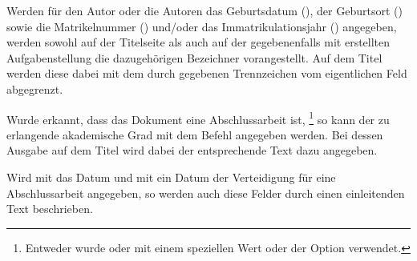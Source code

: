 \begin{Declaration}{}
\begin{Declaration}{}
\begin{Declaration}{}
\begin{Declaration}{}
\printdeclarationlist%
%
%
Werden für den Autor oder die Autoren das Geburtsdatum (), 
der Geburtsort () sowie die
Matrikelnummer () und/oder das Immatrikulationsjahr 
() angegeben, werden sowohl auf der Titelseite als 
auch auf der gegebenenfalls mit  erstellten 
Aufgabenstellung die dazugehörigen Bezeichner vorangestellt. Auf dem Titel 
werden diese dabei mit dem durch  gegebenen Trennzeichen 
vom eigentlichen Feld abgegrenzt.
\end{Declaration}
\end{Declaration}
\end{Declaration}
\end{Declaration}

\begin{Declaration}{}
\printdeclarationlist%
%
%
Wurde erkannt, dass das Dokument eine Abschlussarbeit ist,%
\footnote{%
  Entweder wurde  oder  mit einem speziellen Wert 
  oder der Option  verwendet.
}
so kann der zu erlangende akademische Grad mit dem Befehl  
angegeben werden. Bei dessen Ausgabe auf dem Titel wird dabei der entsprechende 
Text dazu angegeben.
\end{Declaration}

\begin{Declaration}{}
\begin{Declaration}{}
\printdeclarationlist%
%
%
%
Wird mit  das Datum und mit  ein Datum der 
Verteidigung für eine Abschlussarbeit angegeben, so werden auch diese Felder 
durch einen einleitenden Text beschrieben.
\end{Declaration}
\end{Declaration}

